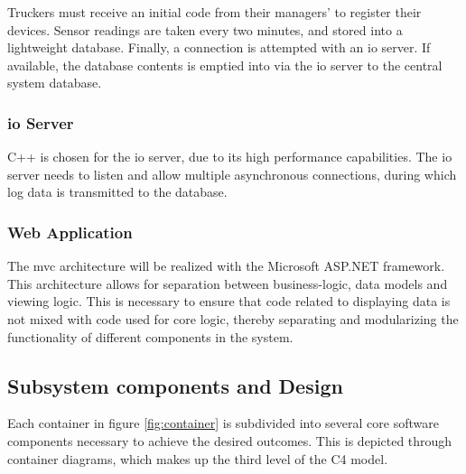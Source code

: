 Truckers must receive an initial code from their managers' to register their devices.
Sensor readings are taken every two minutes, and stored into a lightweight database.
Finally, a connection is attempted with an \ac{io} server. If available, the database contents is emptied into via the \ac{io} server to the central system database.

\subsubsection{\Ac{io} Server}
C++ is chosen for the \ac{io} server, due to its high performance capabilities.
The \ac{io} server needs to listen and allow multiple asynchronous connections, during which log data is transmitted to the database.

\subsubsection{Web Application}
The \ac{mvc} architecture will be realized with the Microsoft ASP.NET framework.
This architecture allows for separation between business-logic, data models and viewing logic.
This is necessary to ensure that code related to displaying data is not mixed with code used for core logic, thereby separating and modularizing the functionality of different components in the system.

\pagebreak
\subsection{Subsystem components and Design}
Each container in figure \ref{fig:container} is subdivided into several core software components necessary to achieve the desired outcomes.
This is depicted through container diagrams, which makes up the third level of the C4 model.

